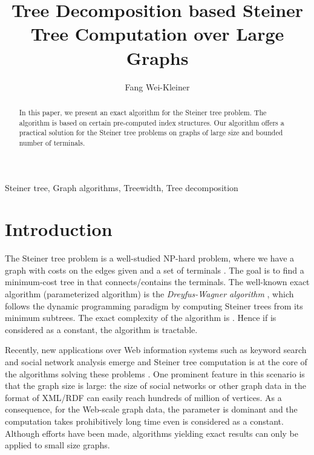 \documentclass[preprint,12pt]{elsarticle}
\begin{document}
\begin{frontmatter}

\title{Tree Decomposition based Steiner Tree Computation over Large Graphs}


\author[label1]{Fang Wei-Kleiner}
 \address[label1]{Lin\"oping University, Sweden}









\begin{abstract}
In this paper, we present an exact algorithm  for the Steiner tree problem.
The algorithm
is based on certain pre-computed index structures.
Our algorithm offers a practical solution
for the Steiner tree problems on graphs of large size and bounded number of terminals.
\end{abstract}

\begin{keyword}
Steiner tree, Graph algorithms, Treewidth, Tree decomposition
\end{keyword}

\end{frontmatter}

\section{Introduction}




The Steiner tree  problem is a well-studied NP-hard problem,
where we have a  graph  with costs on the edges given
and a set of terminals . The goal is to find a minimum-cost tree in  that connects/contains the terminals. 
The well-known exact algorithm (parameterized algorithm)  is the 
\emph{Dreyfus-Wagner algorithm} \cite{DW}, which follows the dynamic programming paradigm by computing 
Steiner trees  from its minimum subtrees.
The exact complexity of the algorithm
is .
Hence if  is considered as a constant, the algorithm is tractable.

Recently, new applications over Web information systems such as keyword search and social network analysis 
emerge and Steiner tree computation is at the core of the algorithms solving these problems \cite{Li2001WWW}.
One prominent feature in this scenario is that the graph size is large: the size of social networks
or other graph data in the format of XML/RDF  can easily reach hundreds of million of vertices.
As a consequence, for the Web-scale graph data, the parameter  is dominant and
the computation takes prohibitively long time even  is considered as a constant.
Although efforts have been made, algorithms yielding exact results
can only be applied to small size graphs\cite{DPBF}.
\end{document}
